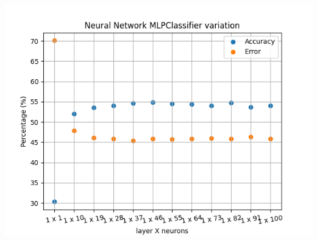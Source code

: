 \begin{center}
    \includegraphics[scale=1]{graphs/neural_network_variation-error_accuracy-0.png}
\end{center}
